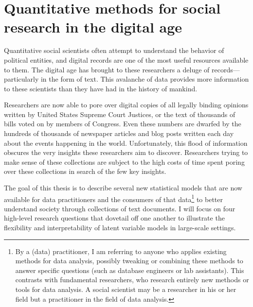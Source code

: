 \chapter{Quantitative methods for social research in the digital age}

Quantitative social scientists often attempt to understand the
behavior of political entities, and digital records are one of the
most useful resources available to them.  The digital age has brought
to these researchers a deluge of records---particularly in the
form of text.  This avalanche of data provides more information to
these scientists than they have had in the history of mankind.

Researchers are now able to pore over digital copies of all legally
binding opinions written by United States Supreme Court Justices, or
the text of thousands of bills voted on by members of Congress.  Even
these numbers are dwarfed by the hundreds of thousands of newspaper
articles and blog posts written each day about the events happening in
the world.  Unfortunately, this flood of information obscures the very
insights these researchers aim to discover.  Researchers trying to
make sense of these collections are subject to the high costs of time
spent poring over these collections in search of the few key insights.

The goal of this thesis is to describe several new statistical models
that are now available for data practitioners and the consumers of that
data\footnote{By a (data) practitioner, I am referring to anyone who
  applies existing methods for data analysis, possibly tweaking or
  combining these methods to answer specific questions (such as
  database engineers or lab assistants). This contrasts with
  fundamental researchers, who research entirely new methods or tools
  for data analysis.  A social scientist may be a researcher
  in his or her field but a practitioner in the field of data
  analysis.} to better understand society through collections of
text documents.  I will focus on four high-level research questions
that dovetail off one another to illustrate the flexibility and
interpretability of latent variable models in large-scale settings.

